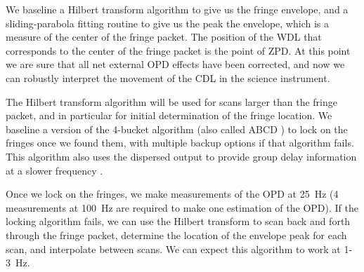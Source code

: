 
We baseline a Hilbert transform algorithm to give us the fringe envelope, and a sliding-parabola fitting routine to give us the peak the envelope, which is a measure of the center of the fringe packet. The position of the WDL that corresponds to the center of the fringe packet is the point of ZPD. At this point we are sure that all net external OPD effects have been corrected, and now we can robustly interpret the movement of the CDL in the science instrument.

The Hilbert transform algorithm will be used for scans larger than the fringe packet, and in particular for initial determination of the fringe location. We baseline a version of the 4-bucket algorithm (also called ABCD \citep{Colavita:2010ce}) to lock on the fringes once we found them, with multiple backup options if that algorithm fails. This algorithm also uses the dispersed output to provide group delay information at a slower frequency \citep{Colavita:2010ce}.

Once we lock on the fringes, we make measurements of the OPD at 25~Hz (4 measurements at 100~Hz are required to make one estimation of the OPD). If the locking algorithm fails, we can use the Hilbert transform to scan back and forth through the fringe packet, determine the location of the envelope peak for each scan, and interpolate between scans. We can expect this algorithm to work at 1-3~Hz.

